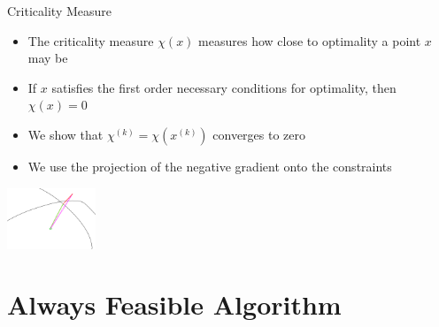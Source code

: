 \documentclass{beamer}
\newcommand{\xk}{{{x}^{(k)}}}
\begin{document}
\begin{frame}{Criticality Measure}
	\begin{itemize}
		\item The criticality measure $\chi\left(x\right)$ measures how close to optimality a point $x$ may be
		\item If $x$ satisfies the first order necessary conditions for optimality, then $\chi(x) = 0$
		\item We show that $\chi^{(k)} = \chi\left(\xk\right)$ converges to zero
		\item We use the projection of the negative gradient onto the constraints
	\end{itemize}
	\begin{center}
		\includegraphics[width=100px]{images/criticality.png}
	\end{center}
\end{frame}






\section{Always Feasible Algorithm}
\end{document}

